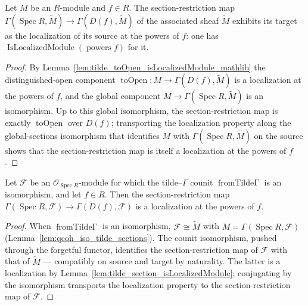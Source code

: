 \begin{lemma}\leanok
  \label{lem:tilde_section_isLocalizedModule}
  Let \(M\) be an \(R\)-module and \(f \in R\). The section-restriction map
  \(\Gamma(\operatorname{Spec} R, \widetilde{M}) \to \Gamma(D(f), \widetilde{M})\) of the associated
  sheaf \(\widetilde{M}\) exhibits its target as the localization of its source at the powers of
  \(f\): one has \(\operatorname{IsLocalizedModule}(\operatorname{powers} f)\) for it.
\end{lemma}
\begin{proof}
  \leanok
  By Lemma~\ref{lem:tilde_toOpen_isLocalizedModule_mathlib} the distinguished-open component
  \(\operatorname{toOpen} : M \to \Gamma(D(f), \widetilde{M})\) is a localization at the powers of
  \(f\), and the global component \(M \to \Gamma(\operatorname{Spec} R, \widetilde{M})\) is an
  isomorphism. Up to this global isomorphism, the section-restriction map is exactly
  \(\operatorname{toOpen}\) over \(D(f)\); transporting the localization property along the
  global-sections isomorphism that identifies \(M\) with \(\Gamma(\operatorname{Spec} R,
  \widetilde{M})\) on the source shows that the section-restriction map is itself a localization at the
  powers of \(f\).
\end{proof}

\begin{lemma}\leanok
  \label{lem:section_isLocalizedModule_of_isIso_fromTildeGamma}
  Let \(\mathcal{F}\) be an \(\mathcal{O}_{\operatorname{Spec} R}\)-module for which the
  tilde--\(\Gamma\) counit \(\operatorname{fromTilde\Gamma}\) is an isomorphism, and let \(f \in R\).
  Then the section-restriction map \(\Gamma(\operatorname{Spec} R, \mathcal{F}) \to \Gamma(D(f),
  \mathcal{F})\) is a localization at the powers of \(f\).
\end{lemma}
\begin{proof}
  \leanok
  When \(\operatorname{fromTilde\Gamma}\) is an isomorphism, \(\mathcal{F} \cong \widetilde{M}\) with
  \(M = \Gamma(\operatorname{Spec} R, \mathcal{F})\) (Lemma~\ref{lem:qcoh_iso_tilde_sections}). The
  counit isomorphism, pushed through the forgetful functor, identifies the section-restriction map of
  \(\mathcal{F}\) with that of \(\widetilde{M}\) — compatibly on source and target by naturality. The
  latter is a localization by Lemma~\ref{lem:tilde_section_isLocalizedModule}; conjugating by the
  isomorphism transports the localization property to the section-restriction map of \(\mathcal{F}\).
\end{proof}


